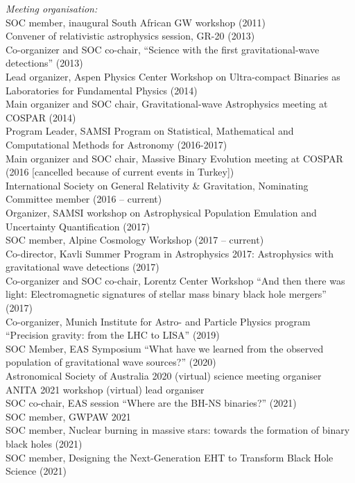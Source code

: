 \documentclass[margin,line]{res}
\begin{document}
\begin{resume}
{\it Meeting organisation:}\\
SOC member, inaugural South African GW workshop (2011)\\
Convener of relativistic astrophysics session, GR-20 (2013)\\
Co-organizer and SOC co-chair, ``Science with the first gravitational-wave detections'' (2013)\\
Lead organizer, Aspen Physics Center Workshop on Ultra-compact Binaries as Laboratories for Fundamental Physics (2014)\\
Main organizer and SOC chair, Gravitational-wave Astrophysics meeting at COSPAR (2014)\\
Program Leader, SAMSI Program on Statistical, Mathematical and Computational Methods for Astronomy (2016-2017)\\
Main organizer and SOC chair, Massive Binary Evolution meeting at COSPAR (2016 [cancelled because of current events in Turkey])\\
International Society on General Relativity \& Gravitation, Nominating Committee member (2016 -- current)\\
Organizer, SAMSI workshop on Astrophysical Population Emulation and Uncertainty Quantification (2017)\\
SOC member, Alpine Cosmology Workshop (2017 -- current)\\
Co-director, Kavli Summer Program in Astrophysics 2017: Astrophysics with gravitational wave detections (2017)\\
Co-organizer and SOC co-chair, Lorentz Center Workshop ``And then there was light:  
Electromagnetic signatures of stellar mass binary black hole mergers'' (2017)\\
Co-organizer, Munich Institute for Astro- and Particle Physics program ``Precision gravity: from the LHC to LISA'' (2019)\\
SOC Member, EAS Symposium ``What have we learned from the observed population of gravitational wave sources?'' (2020)\\
Astronomical Society of Australia 2020 (virtual) science meeting organiser\\
ANITA 2021 workshop (virtual) lead organiser\\
SOC co-chair, EAS session ``Where are the BH-NS binaries?'' (2021)\\
SOC member, GWPAW 2021\\
SOC member, Nuclear burning in massive stars: towards the formation of binary black holes (2021)\\
SOC member, Designing the Next-Generation EHT to Transform Black Hole Science (2021)\\


\end{resume}
\end{document}
